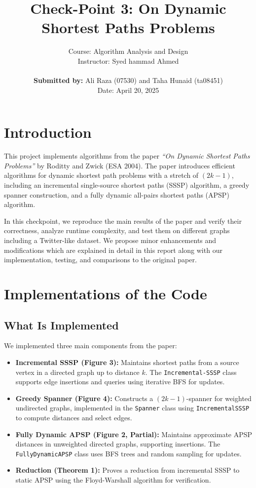 \documentclass[12pt]{article}
\title{Check-Point 3: On Dynamic Shortest Paths Problems}
\author{Course: Algorithm Analysis and Design \\
Instructor: Syed hammad Ahmed \\
\\
\textbf{Submitted by:} Ali Raza (07530) and Taha Hunaid (ta08451) \\
Date: April 20, 2025}
\date{}
\begin{document}
\maketitle

\section*{Introduction}

This project implements algorithms from the paper \textit{``On Dynamic Shortest Paths Problems''} by Roditty and Zwick (ESA 2004). The paper introduces efficient algorithms for dynamic shortest path problems with a stretch of $(2k - 1)$, including an incremental single-source shortest paths (SSSP) algorithm, a greedy spanner construction, and a fully dynamic all-pairs shortest paths (APSP) algorithm. 

In this checkpoint, we reproduce the main results of the paper and verify their correctness, analyze runtime complexity, and test them on different graphs including a Twitter-like dataset. We propose minor enhancements and modifications which are explained in detail in this report along with our implementation, testing, and comparisons to the original paper.

\section*{Implementations of the Code}

\subsection*{What Is Implemented}

We implemented three main components from the paper:
\begin{itemize}
    \item \textbf{Incremental SSSP (Figure 3):} Maintains shortest paths from a source vertex in a directed graph up to distance $k$. The \texttt{Incremental-SSSP} class supports edge insertions and queries using iterative BFS for updates.
    
    \item \textbf{Greedy Spanner (Figure 4):} Constructs a $(2k - 1)$-spanner for weighted undirected graphs, implemented in the \texttt{Spanner} class using \texttt{IncrementalSSSP} to compute distances and select edges.
    
    \item \textbf{Fully Dynamic APSP (Figure 2, Partial):} Maintains approximate APSP distances in unweighted directed graphs, supporting insertions. The \texttt{FullyDynamicAPSP} class uses BFS trees and random sampling for updates.
    
    \item \textbf{Reduction (Theorem 1):} Proves a reduction from incremental SSSP to static APSP using the Floyd-Warshall algorithm for verification.
\end{itemize}
\end{document}

